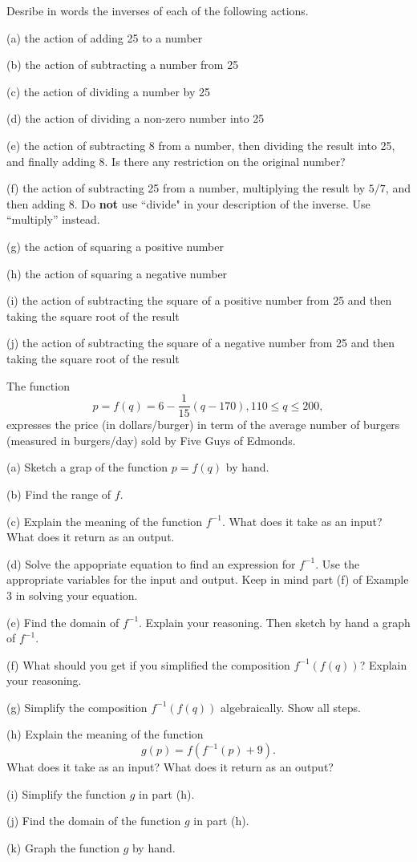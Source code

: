 \documentclass{ximera}
\begin{document}
\begin{example}  \label{Ex2:Inverse}
Desribe in words the inverses of each of the following actions.

(a) the action of adding 25 to a number

(b) the action of subtracting a number from 25

(c) the action of dividing a number by 25

(d) the action of dividing a non-zero number into 25

(e) the action of subtracting 8 from a number, then dividing the result into 25, and finally adding 8. Is there any restriction on the original number?

(f) the action of subtracting 25 from a number, multiplying the result by $5/7$, and then adding 8. Do {\bf not} use ``divide" in your description of the inverse. Use ``multiply'' instead.

(g) the action of squaring a positive number

(h) the action of squaring a negative number

(i) the action of subtracting the square of a positive number from 25 and then taking the square root of the result

(j) the action of subtracting the square of a negative number from 25 and then taking the square root of the result
\end{example}


\begin{example}  \label{Ex3:Inverse}
The function
\[
    p = f(q) = 6 - \frac{1}{15} \left(  q- 170 \right) , 110 \leq q \leq 200 ,
\]
expresses the price (in dollars/burger) in term of the average number of burgers (measured in burgers/day) sold by Five Guys of Edmonds.

(a) Sketch a grap of the function $p=f(q)$ by hand.

(b) Find the range of $f$.

(c) Explain the meaning of the function $f^{-1}$. What does it take as an input? What does it return as an output.

(d) Solve the appopriate equation to find an expression for $f^{-1}$. Use the appropriate variables for the input and output. Keep in mind part (f) of Example 3 in solving your equation.

(e) Find the domain of $f^{-1}$. Explain your reasoning. Then sketch by hand a graph of $f^{-1}$.

(f) What should you get if you simplified the composition $f^{-1}(f(q))$? Explain your reasoning.

(g) Simplify the composition $f^{-1}(f(q))$ algebraically. Show all steps.

(h) Explain the meaning of the function 
\[
  g(p) = f(f^{-1}(p)+9).
\]
What does it take as an input? What does it return as an output?

(i) Simplify the function $g$ in part (h).

(j) Find the domain of the function $g$ in part (h).

(k) Graph the function $g$ by hand. 


\end{example}
\end{document}

